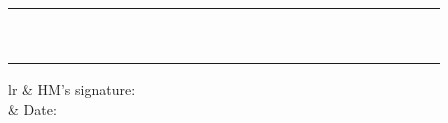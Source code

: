 \documentclass[12pt]{article}
\begin{document}
\begin{longtable}{|l|p{3.0cm}|p{3.0cm}|p{3.0cm}|l|p{2cm}|l|l|l|l|l|l|l|l|l|l|l|l|l|l|l|l|l|l|l|l|l|}
 & \relax & \relax & \relax & \relax & \relax & \relax & \relax & & & & & & & & & & & & & & & & & & \\ \hline
 & \relax & \relax & \relax & \relax & \relax & \relax & \relax & & & & & & & & & & & & & & & & & & \\ \hline
 & \relax & \relax & \relax & \relax & \relax & \relax & \relax & & & & & & & & & & & & & & & & & & \\ \hline
 & \relax & \relax & \relax & \relax & \relax & \relax & \relax & & & & & & & & & & & & & & & & & & \\ \hline
 & \relax & \relax & \relax & \relax & \relax & \relax & \relax & & & & & & & & & & & & & & & & & & \\ \hline
 & \relax & \relax & \relax & \relax & \relax & \relax & \relax & & & & & & & & & & & & & & & & & & \\ \hline
 & \relax & \relax & \relax & \relax & \relax & \relax & \relax & & & & & & & & & & & & & & & & & & \\ \hline
 & \relax & \relax & \relax & \relax & \relax & \relax & \relax & & & & & & & & & & & & & & & & & & \\ \hline
 & \relax & \relax & \relax & \relax & \relax & \relax & \relax & & & & & & & & & & & & & & & & & & \\ \hline
 & \relax & \relax & \relax & \relax & \relax & \relax & \relax & & & & & & & & & & & & & & & & & & \\ \hline
\end{longtable}



    \begin{tabular}{lr}
     & HM's signature: \\
    & Date:
    \end{tabular}
  
\end{document}
